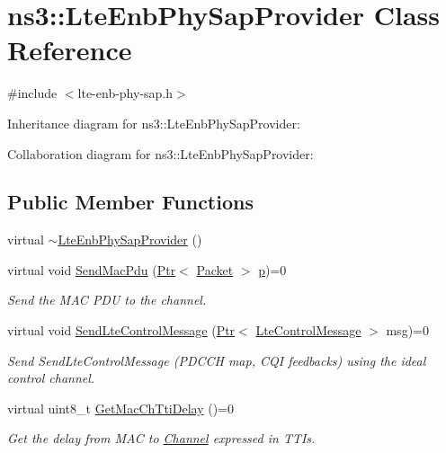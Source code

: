 \hypertarget{classns3_1_1LteEnbPhySapProvider}{}\section{ns3\+:\+:Lte\+Enb\+Phy\+Sap\+Provider Class Reference}
\label{classns3_1_1LteEnbPhySapProvider}


{\ttfamily \#include $<$lte-\/enb-\/phy-\/sap.\+h$>$}



Inheritance diagram for ns3\+:\+:Lte\+Enb\+Phy\+Sap\+Provider\+:


Collaboration diagram for ns3\+:\+:Lte\+Enb\+Phy\+Sap\+Provider\+:
\subsection*{Public Member Functions}
\begin{DoxyCompactItemize}
\item 
virtual \hyperlink{classns3_1_1LteEnbPhySapProvider_a278f4d7d5f71feb47e3e6bb8294d4373}{$\sim$\+Lte\+Enb\+Phy\+Sap\+Provider} ()
\item 
virtual void \hyperlink{classns3_1_1LteEnbPhySapProvider_ad9d8ed21001df4df23c132fd90cf402d}{Send\+Mac\+Pdu} (\hyperlink{classns3_1_1Ptr}{Ptr}$<$ \hyperlink{classns3_1_1Packet}{Packet} $>$ \hyperlink{lte__link__budget__x2__handover__measures_8m_ac9de518908a968428863f829398a4e62}{p})=0
\begin{DoxyCompactList}\small\item\em Send the M\+AC P\+DU to the channel. \end{DoxyCompactList}\item 
virtual void \hyperlink{classns3_1_1LteEnbPhySapProvider_a091d846bf3255f2ae15a8cea600fba0e}{Send\+Lte\+Control\+Message} (\hyperlink{classns3_1_1Ptr}{Ptr}$<$ \hyperlink{classns3_1_1LteControlMessage}{Lte\+Control\+Message} $>$ msg)=0
\begin{DoxyCompactList}\small\item\em Send Send\+Lte\+Control\+Message (P\+D\+C\+CH map, C\+QI feedbacks) using the ideal control channel. \end{DoxyCompactList}\item 
virtual uint8\+\_\+t \hyperlink{classns3_1_1LteEnbPhySapProvider_abba227e215f299b227e928e5a0ff0442}{Get\+Mac\+Ch\+Tti\+Delay} ()=0
\begin{DoxyCompactList}\small\item\em Get the delay from M\+AC to \hyperlink{classns3_1_1Channel}{Channel} expressed in T\+T\+Is. \end{DoxyCompactList}\end{DoxyCompactItemize}


